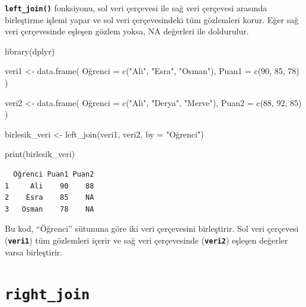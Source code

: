 \documentclass[
  letterpaper,
  DIV=11,
  numbers=noendperiod]{scrreprt}
\newenvironment{Shaded}{\begin{snugshade}}{\end{snugshade}}
\newcommand{\AttributeTok}[1]{\textcolor[rgb]{0.40,0.45,0.13}{#1}}
\newcommand{\DecValTok}[1]{\textcolor[rgb]{0.68,0.00,0.00}{#1}}
\newcommand{\FunctionTok}[1]{\textcolor[rgb]{0.28,0.35,0.67}{#1}}
\newcommand{\NormalTok}[1]{\textcolor[rgb]{0.00,0.23,0.31}{#1}}
\newcommand{\OtherTok}[1]{\textcolor[rgb]{0.00,0.23,0.31}{#1}}
\newcommand{\StringTok}[1]{\textcolor[rgb]{0.13,0.47,0.30}{#1}}
\begin{document}

\textbf{\texttt{left\_join()}} fonksiyonu, sol veri çerçevesi ile sağ
veri çerçevesi arasında birleştirme işlemi yapar ve sol veri
çerçevesindeki tüm gözlemleri korur. Eğer sağ veri çerçevesinde eşleşen
gözlem yoksa, NA değerleri ile doldurulur.

\begin{Shaded}
\begin{Highlighting}[]
\FunctionTok{library}\NormalTok{(dplyr)}

\NormalTok{veri1 }\OtherTok{\textless{}{-}} \FunctionTok{data.frame}\NormalTok{(}
\NormalTok{  Oğrenci }\OtherTok{=} \FunctionTok{c}\NormalTok{(}\StringTok{"Ali"}\NormalTok{, }\StringTok{"Esra"}\NormalTok{, }\StringTok{"Osman"}\NormalTok{),}
  \AttributeTok{Puan1 =} \FunctionTok{c}\NormalTok{(}\DecValTok{90}\NormalTok{, }\DecValTok{85}\NormalTok{, }\DecValTok{78}\NormalTok{)}
\NormalTok{)}

\NormalTok{veri2 }\OtherTok{\textless{}{-}} \FunctionTok{data.frame}\NormalTok{(}
\NormalTok{  Oğrenci }\OtherTok{=} \FunctionTok{c}\NormalTok{(}\StringTok{"Ali"}\NormalTok{, }\StringTok{"Derya"}\NormalTok{, }\StringTok{"Merve"}\NormalTok{),}
  \AttributeTok{Puan2 =} \FunctionTok{c}\NormalTok{(}\DecValTok{88}\NormalTok{, }\DecValTok{92}\NormalTok{, }\DecValTok{85}\NormalTok{)}
\NormalTok{)}

\NormalTok{birlesik\_veri }\OtherTok{\textless{}{-}} \FunctionTok{left\_join}\NormalTok{(veri1, veri2, }\AttributeTok{by =} \StringTok{"Oğrenci"}\NormalTok{)}

\FunctionTok{print}\NormalTok{(birlesik\_veri)}
\end{Highlighting}
\end{Shaded}

\begin{verbatim}
  Oğrenci Puan1 Puan2
1     Ali    90    88
2    Esra    85    NA
3   Osman    78    NA
\end{verbatim}

Bu kod, ``Öğrenci'' sütununa göre iki veri çerçevesini birleştirir. Sol
veri çerçevesi (\textbf{\texttt{veri1}}) tüm gözlemleri içerir ve sağ
veri çerçevesinde (\textbf{\texttt{veri2}}) eşleşen değerler varsa
birleştirir.

\section*{\texorpdfstring{\textbf{\texttt{right\_join}}}{right\_join}}\label{right_join}
\end{document}
